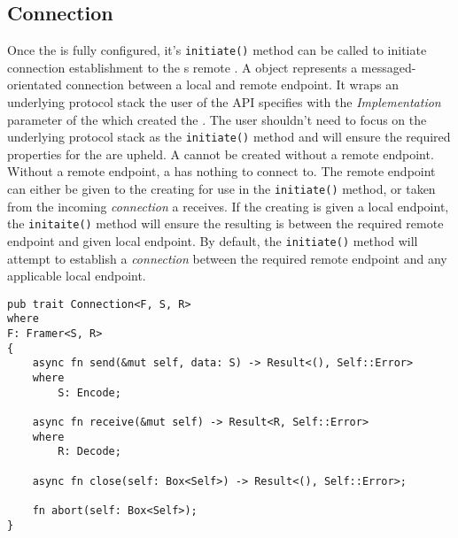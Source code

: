 \subsection{Connection}\label{subsec:connection}
Once the \preconnection{} is fully configured, it's \texttt{initiate()} method can be called to initiate connection
establishment to the \preconnection{}s remote \Endpoint{}.
A \connection{} object represents a messaged-orientated connection between a local and remote endpoint.
It wraps an underlying protocol stack the user of the API specifies with the \emph{Implementation}
parameter of the \preconnection{} which created the \connection{}.
The user shouldn't need to focus on the underlying protocol stack as the \texttt{initiate()} method and
\listener{} will ensure the required properties for the \connection{} are upheld.
A \connection{} cannot be created without a remote endpoint.
Without a remote endpoint, a \connection{} has nothing to connect to.
The remote endpoint can either be given to the creating \preconnection{} for use in the \texttt{initiate()} method,
or taken from the incoming \emph{connection} a \listener{} receives.
If the creating \preconnection{} is given a local endpoint, the \texttt{initaite()} method will ensure the resulting
\connection{} is between the required remote endpoint and given local endpoint.
By default, the \texttt{initiate()} method will attempt to establish a \emph{connection} between the required remote
endpoint and any applicable local endpoint.

\begin{lstlisting}[float=h, label=lst:connection, caption={The Connection trait.}]
pub trait Connection<F, S, R>
where
F: Framer<S, R>
{
    async fn send(&mut self, data: S) -> Result<(), Self::Error>
    where
        S: Encode;

    async fn receive(&mut self) -> Result<R, Self::Error>
    where
        R: Decode;

    async fn close(self: Box<Self>) -> Result<(), Self::Error>;

    fn abort(self: Box<Self>);
}
\end{lstlisting}

